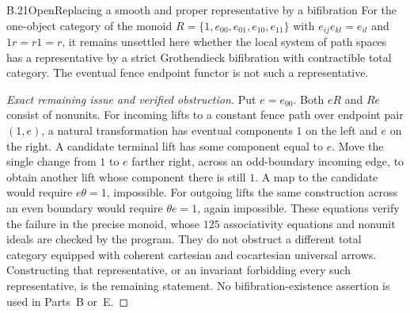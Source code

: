 \begin{claim}{B.21}{Open}{Replacing a smooth and proper representative by a bifibration}
For the one-object category of the monoid
$R=\{1,e_{00},e_{01},e_{10},e_{11}\}$ with
$e_{ij}e_{kl}=e_{il}$ and $1r=r1=r$, it remains unsettled here whether
the local system of path spaces has a representative by a strict
Grothendieck bifibration with contractible total category.
The eventual fence endpoint functor is not such a representative.
\end{claim}
\begin{proof}[Exact remaining issue and verified obstruction]
Put $e=e_{00}$. Both $eR$ and $Re$ consist of nonunits.
For incoming lifts to a constant fence path over endpoint pair $(1,e)$,
a natural transformation has eventual components $1$ on the left and
$e$ on the right. A candidate terminal lift has some component equal to
$e$. Move the single change from $1$ to $e$ farther right, across an
odd-boundary incoming edge, to obtain another lift whose component there
is still $1$. A map to the candidate would require $e\theta=1$, impossible.
For outgoing lifts the same construction across an even boundary would
require $\theta e=1$, again impossible. These equations verify the
failure in the precise monoid, whose $125$ associativity equations and
nonunit ideals are checked by the program.
They do not obstruct a different total category equipped with coherent
cartesian and cocartesian universal arrows. Constructing that representative,
or an invariant forbidding every such representative, is the remaining
statement. No bifibration-existence assertion is used in Parts~B or~E.
\end{proof}

